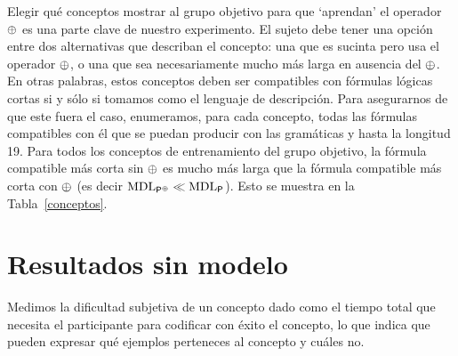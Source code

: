 
Elegir qué conceptos mostrar al grupo objetivo para que `aprendan' el operador $\oplus$ es una parte clave de nuestro experimento. El sujeto debe tener una opción entre dos alternativas que describan el concepto: una que es sucinta pero usa el operador $\oplus$, o una que sea necesariamente mucho más larga en ausencia del $\oplus$. En otras palabras, estos conceptos deben ser compatibles con fórmulas lógicas cortas si y sólo si tomamos \gramboolxor como el lenguaje de descripción. Para asegurarnos de que este fuera el caso, enumeramos, para cada concepto, todas las fórmulas compatibles con él que se puedan producir con las gramáticas \grambool y \gramboolxor hasta la longitud 19. Para todos los conceptos de entrenamiento del grupo objetivo, la fórmula compatible más corta sin $\oplus$ es mucho más larga que la fórmula compatible más corta con $\oplus$ (es decir ${\rm MDL}_{{\sf P}^\oplus}\ll{\rm MDL}_{{\sf P}}$). Esto se muestra en la Tabla~\ref{conceptos}.

\section{Resultados sin modelo}


Medimos la dificultad subjetiva de un concepto dado como el tiempo total que necesita el participante para codificar con éxito el concepto, lo que indica que pueden expresar qué ejemplos perteneces al concepto y cuáles no.


